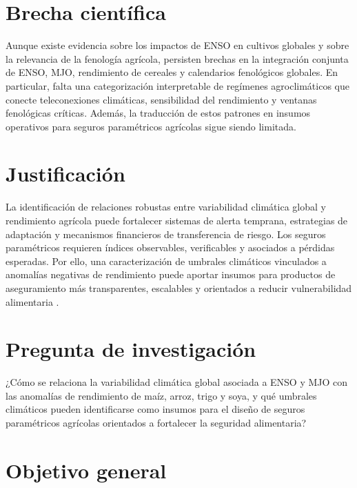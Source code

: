 
\section{Brecha científica}

Aunque existe evidencia sobre los impactos de ENSO en cultivos globales y sobre la relevancia de la fenología agrícola, persisten brechas en la integración conjunta de ENSO, MJO, rendimiento de cereales y calendarios fenológicos globales. En particular, falta una categorización interpretable de regímenes agroclimáticos que conecte teleconexiones climáticas, sensibilidad del rendimiento y ventanas fenológicas críticas. Además, la traducción de estos patrones en insumos operativos para seguros paramétricos agrícolas sigue siendo limitada.

\section{Justificación}

La identificación de relaciones robustas entre variabilidad climática global y rendimiento agrícola puede fortalecer sistemas de alerta temprana, estrategias de adaptación y mecanismos financieros de transferencia de riesgo. Los seguros paramétricos requieren índices observables, verificables y asociados a pérdidas esperadas. Por ello, una caracterización de umbrales climáticos vinculados a anomalías negativas de rendimiento puede aportar insumos para productos de aseguramiento más transparentes, escalables y orientados a reducir vulnerabilidad alimentaria \parencite{carter2017index}.

\section{Pregunta de investigación}

¿Cómo se relaciona la variabilidad climática global asociada a ENSO y MJO con las anomalías de rendimiento de maíz, arroz, trigo y soya, y qué umbrales climáticos pueden identificarse como insumos para el diseño de seguros paramétricos agrícolas orientados a fortalecer la seguridad alimentaria?

\section{Objetivo general}

